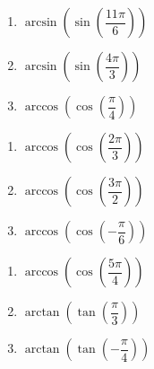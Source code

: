 \documentclass{ximera}
\begin{document}
\begin{multicols}{3}

\begin{enumerate}

\setcounter{enumi}{\value{HW}}

\item  $\arcsin\left(\sin\left(\dfrac{11\pi}{6}\right) \right)$
\item  $\arcsin\left(\sin\left(\dfrac{4\pi}{3}\right) \right)$
\item  $\arccos\left(\cos\left(\dfrac{\pi}{4}\right) \right)$  

\setcounter{HW}{\value{enumi}}

\end{enumerate}

\end{multicols}

\begin{multicols}{3}

\begin{enumerate}

\setcounter{enumi}{\value{HW}}

\item  $\arccos\left(\cos\left(\dfrac{2\pi}{3}\right) \right)$
\item  $\arccos\left(\cos\left(\dfrac{3\pi}{2}\right) \right)$
\item  $\arccos\left(\cos\left(-\dfrac{\pi}{6}\right) \right)$  

\setcounter{HW}{\value{enumi}}

\end{enumerate}

\end{multicols}

\begin{multicols}{3}

\begin{enumerate}

\setcounter{enumi}{\value{HW}}

\item  $\arccos\left(\cos\left(\dfrac{5\pi}{4}\right) \right)$
\item  $\arctan\left(\tan\left(\dfrac{\pi}{3}\right) \right)$  
\item  $\arctan\left(\tan\left(-\dfrac{\pi}{4}\right) \right)$  

\setcounter{HW}{\value{enumi}}

\end{enumerate}

\end{multicols}
\end{document}
